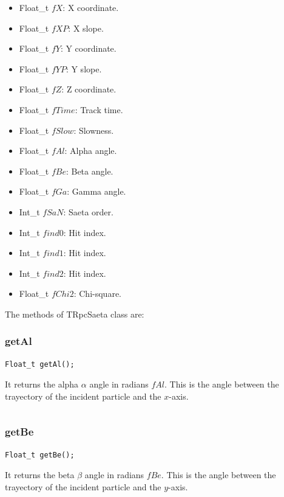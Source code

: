 \documentclass[a4paper]{book}
\begin{document}
\begin{itemize}
	\item Float\_t $fX$: X coordinate.
	\item Float\_t $fXP$: X slope.
	\item Float\_t $fY$: Y coordinate.
	\item Float\_t $fYP$: Y slope.
	\item Float\_t $fZ$: Z coordinate.
	\item Float\_t $fTime$: Track time.
	\item Float\_t $fSlow$: Slowness.
	\item Float\_t $fAl$: Alpha angle.
	\item Float\_t $fBe$: Beta angle.
	\item Float\_t $fGa$: Gamma angle.
	\item Int\_t   $fSaN$: Saeta order.
	\item Int\_t   $find0$: Hit index.
	\item Int\_t   $find1$: Hit index.
	\item Int\_t   $find2$: Hit index.
	\item Float\_t $fChi2$: Chi-square.
\end{itemize}

The methods of TRpcSaeta class are:

\subsubsection{getAl}

\begin{lstlisting}
Float_t getAl();
\end{lstlisting}

It returns the alpha $\alpha$ angle in radians $fAl$. This is the angle between the trayectory of the incident particle and the $x$-axis.

\[\]

\subsubsection{getBe}

\begin{lstlisting}
Float_t getBe();
\end{lstlisting}

It returns the beta $\beta$ angle in radians $fBe$. This is the angle between the trayectory of the incident particle and the $y$-axis.

\[\]
\end{document}
